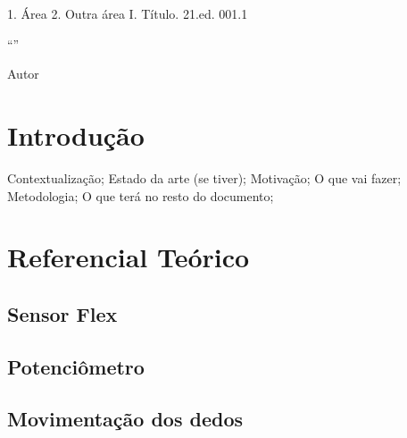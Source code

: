 \documentclass{../ufpatcc}
\begin{document}
  \capa
  \folhaderosto
                     {1. Área 2. Outra área I. Título.}
                     {21.ed. 001.1}
  \begin{dedicatoria}
    \lipsum[13]
  \end{dedicatoria}
  \begin{agradecimentos}
    \lipsum[1-5]
  \end{agradecimentos}
  \begin{epigrafe}
    ``\lipsum*[101]''\par
      Autor
  \end{epigrafe}
  \begin{resumo}
    \lipsum[1]
  \end{resumo}
  \begin{abstract}
    \lipsum[1]
  \end{abstract}
  \tableofcontents

	
  \chapter{Introdução} %
		
		Contextualização; Estado da arte (se tiver); Motivação; O que vai fazer; Metodologia; O que terá no resto do documento;


	\chapter{Referencial Teórico}

		\section{Sensor Flex}

		\section{Potenciômetro}

		\section{Movimentação dos dedos}
\end{document}
